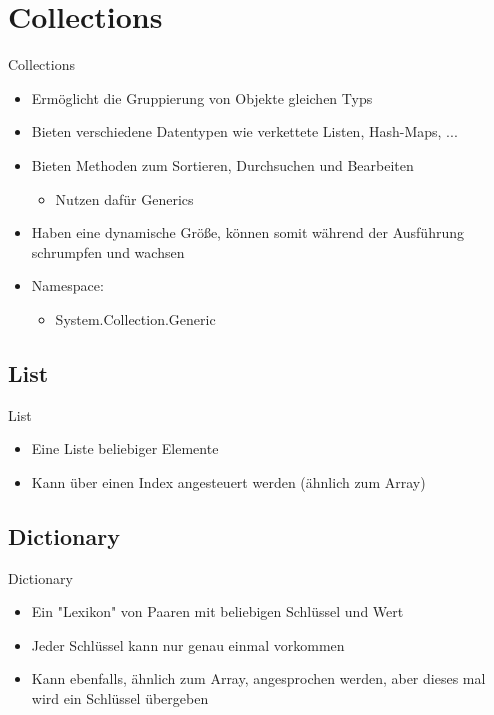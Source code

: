 \section{Collections}
\begin{frame}{Collections}
	\begin{itemize}
		\item Ermöglicht die Gruppierung von Objekte gleichen Typs
		\item Bieten verschiedene Datentypen wie verkettete Listen, Hash-Maps, ...
		\item Bieten Methoden zum Sortieren, Durchsuchen und Bearbeiten
		\begin{itemize}
			\item Nutzen dafür Generics
		\end{itemize}
		\item Haben eine dynamische Größe, können somit während der Ausführung schrumpfen und wachsen
		\item Namespace:
		\begin{itemize}			
			\item \alert{System.Collection.Generic}
		\end{itemize}
	\end{itemize}
\end{frame}

\subsection{List}
\begin{frame}{List}
	\begin{itemize}
		\item Eine Liste beliebiger Elemente
		\item Kann über einen Index angesteuert werden (ähnlich zum Array)
	\end{itemize}
	
\end{frame}

\subsection{Dictionary}
\begin{frame}{Dictionary}
	\begin{itemize}
		\item Ein "Lexikon" von Paaren mit beliebigen Schlüssel und Wert
		\item Jeder Schlüssel kann nur genau einmal vorkommen
		\item Kann ebenfalls, ähnlich zum Array, angesprochen werden, aber dieses mal wird ein Schlüssel übergeben
	\end{itemize}
	
\end{frame}

